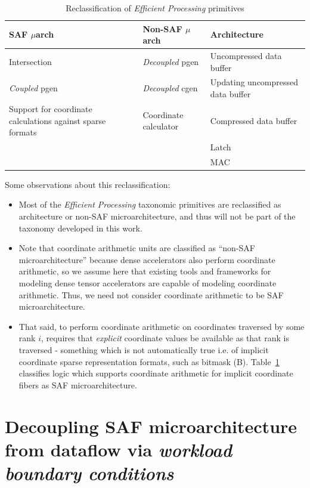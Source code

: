 \begin{table}
\centering
\caption{Reclassification of \textit{Efficient Processing}\cite{szebook} primitives}
\label{tab:reclassify_saf_microarchitecture}
\begin{tabular}{||p{}|l|l||}\hline
\textbf{SAF $\mu$arch} & \textbf{Non-SAF $\mu$arch} & \textbf{Architecture}  \\\hline
Intersection & \textit{Decoupled} pgen & Uncompressed data buffer \\\hline
\textit{Coupled} pgen & \textit{Decoupled} cgen & Updating uncompressed data buffer \\\hline
Support for coordinate calculations against sparse formats & Coordinate calculator & Compressed data buffer \\\hline
 &  & Latch \\\hline
 &  & MAC \\\hline
\end{tabular}
\end{table}

Some observations about this reclassification:
\begin{itemize}
    \item Most of the \textit{Efficient Processing} taxonomic primitives are reclassified as architecture or non-SAF microarchitecture, and thus will not be part of the taxonomy developed in this work.
    \item Note that coordinate arithmetic units are classified as ``non-SAF microarchitecture'' because dense accelerators also perform coordinate arithmetic, so we assume here that existing tools and frameworks for modeling dense tensor accelerators are capable of modeling coordinate arithmetic. Thus, we need not consider coordinate arithmetic to be SAF microarchitecture.
    \item That said, to perform coordinate arithmetic on coordinates traversed by some rank $i$, requires that \textit{explicit}\cite{szebook} coordinate values be available as that rank is traversed - something which is not automatically true i.e. of implicit coordinate sparse representation formats, such as bitmask (B)\cite{szebook}. Table~\ref{tab:reclassify_saf_microarchitecture} classifies logic which supports coordinate arithmetic for implicit coordinate fibers as SAF microarchitecture.
\end{itemize}

\section{Decoupling SAF microarchitecture from dataflow via \textit{workload boundary conditions}}

